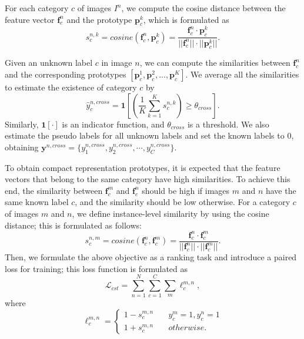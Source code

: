 For each category $c$ of images $I^n$, we compute the cosine distance between the feature vector $\mathbf{f}_c^n$ and the prototype $\mathbf{p}_c^k$, which is formulated as
\begin{equation}
 s^{n, k}_c=cosine(\textbf{f}^n_c, \textbf{p}^k_c) = \frac{\textbf{f}^n_c\cdot\textbf{p}^k_c}{||\textbf{f}^n_c||\cdot||\textbf{p}^k_c||}.
\end{equation}

Given an unknown label $c$ in image $n$, we can compute the similarities between $\textbf{f}^n_c$ and the corresponding prototypes $[\textbf{p}^1_c, \textbf{p}^2_c, ..., \textbf{p}^K_c]$. We average all the similarities to estimate the existence of category $c$ by
\begin{equation}
 \hat{y}^{n, cross}_{c}=\textbf{1}[(\frac{1}{K}\sum_{k=1}^Ks_{c}^{n,k}) \ge \theta_{cross}].
 \label{equ:cross-label}
\end{equation}
Similarly, $\textbf{1}[\cdot]$ is an indicator function, and $\theta_{cross}$ is a threshold. We also estimate the pseudo labels for all unknown labels and set the known labels to 0, obtaining $\textbf{y}^{n, cross}=\{y^{n, cross}_1, y^{n, cross}_2, \cdots, y^{n, cross}_C\}$.

To obtain compact representation prototypes, it is expected that the feature vectors that belong to the same category have high similarities. To achieve this end, the similarity between $\textbf{f}^m_c$ and $\textbf{f}^n_c$ should be high if images $m$ and $n$ have the same known label $c$, and the similarity should be low otherwise. For a category $c$ of images $m$ and $n$, we define instance-level similarity by using the cosine distance; this is formulated as follows:
\begin{equation}
 s^{n,m}_c=cosine(\textbf{f}^n_c, \textbf{f}^m_c) = \frac{\textbf{f}^n_c\cdot\textbf{f}^m_c}{||\textbf{f}^n_c||\cdot||\textbf{f}^m_c||}.
\end{equation}
Then, we formulate the above objective as a ranking task and introduce a paired loss for training; this loss function is formulated as
\begin{equation}
\mathcal{L}_{cst}=\sum_{n=1}^N\sum_{c=1}^C\sum_{m} \ell^{m,n}_c,
\end{equation}
where
\begin{equation}
\ell^{m,n}_c=
    \begin{cases}
         1-s^{m,n}_c \quad & y_c^m=1,y_c^n=1\\
         1+s^{m,n}_c \quad & otherwise.
    \end{cases}
\end{equation}

